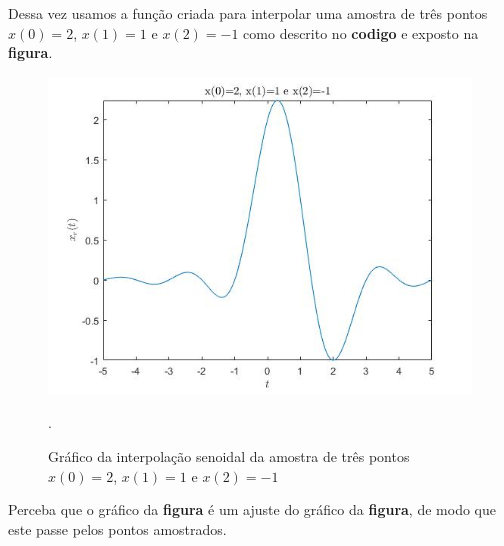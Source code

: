 \documentclass[a4paper, 12pt]{article}
\begin{document}
Dessa vez usamos a função criada para interpolar uma amostra de três pontos $x(0)=2$, $x(1)=1$ e $x(2)=-1$ como descrito no \textbf{codigo} e exposto na \textbf{figura}.



\begin{figure}[H]
	\centering
	\includegraphics[scale=0.6]{../Imagens/ex6/c.jpg} 
	\caption{Gráfico da interpolação senoidal da amostra de três pontos $x(0)=2$, $x(1)=1$ e $x(2)=-1$}.
	\label{fig:1a}
\end{figure}

Perceba que o gráfico da \textbf{figura} é um ajuste do gráfico da \textbf{figura}, de modo que este passe pelos pontos amostrados.
\end{document}

